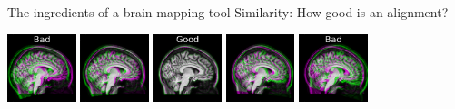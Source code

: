 \documentclass{beamer}
\begin{document}
\begin{frame}{The ingredients of a brain mapping tool}
\vspace{1em}
Similarity: How good is an alignment?

\includegraphics[width=0.15\textwidth]{ex2_affine_n_1}
\includegraphics[width=0.15\textwidth]{ex2_affine_n_2}
\includegraphics[width=0.15\textwidth]{ex2_affine_n_3}
\includegraphics[width=0.15\textwidth]{ex2_affine_n_4}
\includegraphics[width=0.15\textwidth]{ex2_affine_n_5}



\end{frame}
\end{document}
